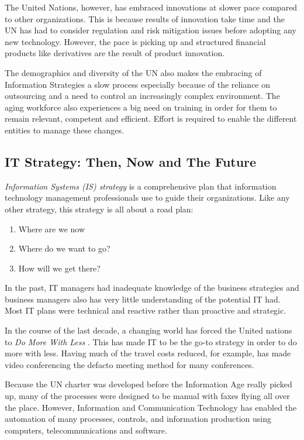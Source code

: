 \documentclass[12pt]{article}
\begin{document}
The United Nations, however, has embraced innovations at slower pace compared to other organizations. This is because results of innovation take time and the UN has had to consider regulation and risk mitigation issues before adopting any new technology. However, the pace is picking up and structured financial products like derivatives are the result of product innovation.

The demographics and diversity of the UN also makes the embracing of Information Strategies a slow process especially because of the reliance on outsourcing and a need to control an increasingly complex environment. The aging workforce also experiences a big need on training in order for them to remain relevant, competent and efficient. Effort is required to enable the different entities to manage these changes.

\subsection*{IT Strategy: Then, Now and The Future}
\textit{Information Systems (IS) strategy} is a comprehensive plan that information technology management professionals use to guide their organizations. Like any other strategy, this strategy is all about a road plan:

\begin{enumerate}
\item Where are we now
\item Where do we want to go?
\item How will we get there?
\end{enumerate}

In the past, IT managers had inadequate knowledge of the business strategies and business managers also has very little understanding of the potential IT had. Most IT plans were technical and reactive rather than proactive and strategic. 

In the course of the last decade, a changing world has forced the United nations to \emph{Do More With Less} \cite{undaf}. This has made IT to be the go-to strategy in order to do more with less. Having much of the travel costs reduced, for example, has made video conferencing the defacto meeting method for many conferences.

Because the UN charter was developed before the Information Age really picked up, many of the processes were designed to be manual with faxes flying all over the place. However, Information and Communication Technology has enabled the automation of many processes, controls, and information production using computers, telecommunications and software.
\end{document}
